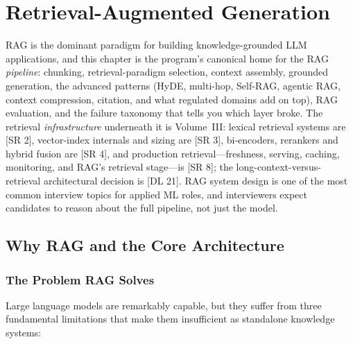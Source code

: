 
\chapter{Retrieval-Augmented Generation}
\label{chap:rag}

\begin{tldr}
RAG is the dominant paradigm for building knowledge-grounded LLM applications,
and this chapter is the program's canonical home for the RAG \emph{pipeline}:
chunking, retrieval-paradigm selection, context assembly, grounded generation,
the advanced patterns (HyDE, multi-hop, Self-RAG, agentic RAG, context
compression, citation, and what regulated domains add on top), RAG
evaluation, and the failure taxonomy that tells you which layer broke.  The
retrieval \emph{infrastructure} underneath it is Volume~III: lexical
retrieval systems are [SR 2], vector-index internals and sizing are [SR 3],
bi-encoders, rerankers and hybrid fusion are [SR 4], and production
retrieval---freshness, serving, caching, monitoring, and RAG's retrieval
stage---is [SR 8]; the long-context-versus-retrieval architectural
decision is [DL 21].  RAG system design is one of the most common interview
topics for applied ML roles, and interviewers expect candidates to reason about
the full pipeline, not just the model.
\end{tldr}

\bigskip

\section{Why RAG and the Core Architecture}
\label{sec:rag-overview}

\subsection{The Problem RAG Solves}

Large language models are remarkably capable, but they suffer from three
fundamental limitations that make them insufficient as standalone knowledge
systems:

